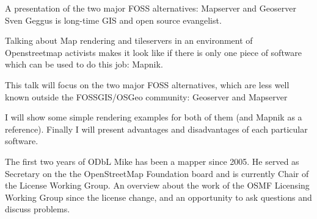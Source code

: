 %
{A presentation of the two major FOSS alternatives: Mapserver and Geoserver}%
{Sven Geggus is long-time GIS and open source evangelist.}%
{Talking about Map rendering and tileservers in an environment of Openstreetmap activists makes it look like if there is only one piece of software which can be used to do this job: Mapnik.

This talk will focus on the two major FOSS alternatives, which are less well
known outside the FOSSGIS/OSGeo community: Geoserver and Mapserver

I will show some simple rendering examples for both of them (and Mapnik as a reference). Finally I will present advantages and disadvantages of each particular software.}

%
{The first two years of ODbL}%
{Mike has been a mapper since 2005. He served as Secretary on the the OpenStreetMap Foundation board and is currently Chair of the License Working Group. }%
{An overview about the work of the OSMF Licensing Working Group since the license change, and an opportunity to ask questions and discuss problems. }

